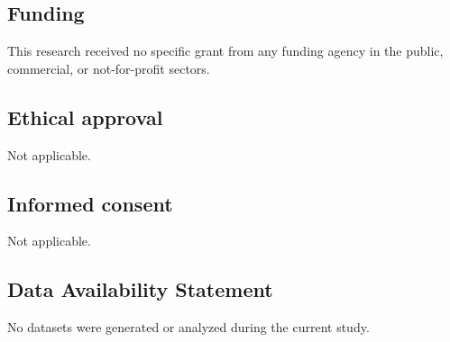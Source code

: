 \documentclass[10pt]{amsart}
\newcommand{\1}{{\mathbb{I}}}
\numberwithin{equation}{section}
\begin{document}
\subsection*{Funding}
This research received no specific grant from any funding agency in the public, commercial, or not-for-profit sectors.

\subsection*{Ethical approval}
Not applicable.

\subsection*{Informed consent}
Not applicable.

\subsection*{Data Availability Statement}
No datasets were generated or analyzed during the current study.
\end{document}
